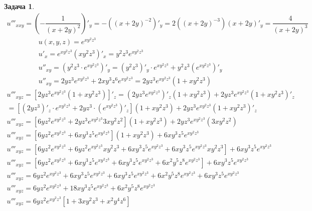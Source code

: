 \documentclass[a4paper,fleqn,12pt]{article}
\theoremstyle{definition}
\newtheorem{task}{Задача}[subsection]
\begin{document}
\begin{task}
\begin{gather*}
u'''_{xxy} = \left( -\dfrac{1}{(x + 2y)^2} \right)'_y = -((x+2y)^{-2})'_y = 2((x+2y)^{-3})(x+2y)'_y = \dfrac{4}{(x+2y)^3}
\end{gather*}
\begin{gather*}
u(x,y,z) = e^{xy^2z^3}\\
u'_x =  e^{xy^2z^3}(xy^2z^3)'_x = y^2z^3e^{xy^2z^3}\\
u''_{xy} = (y^2z^3 \cdot e^{xy^2z^3})'_y = (y^2z^3)'_y \cdot e^{xy^2z^3} + y^2z^3 (e^{xy^2z^3})'_y\\
u''_{xy} = 2yz^3e^{xy^2z^3} + 2xy^3z^6e^{xy^2z^3} =  2yz^3e^{xy^2z^3} (1 + xy^2z^3)
\end{gather*}
\begin{gather*}
u'''_{xyz} = \left[ 2yz^3e^{xy^2z^3} (1 + xy^2z^3) \right]'_z = (2yz^3e^{xy^2z^3})'_z (1 + xy^2z^3) + 2yz^3e^{xy^2z^3}(1 + xy^2z^3)'_z\\
=  \left[(2yz^3)'_z\cdot e^{xy^2z^3}+ 2yz^3 \cdot (e^{xy^2z^3})'_z\right] (1 + xy^2z^3) + 2yz^3e^{xy^2z^3}(1 + xy^2z^3)'_z \\
u'''_{xyz} = \left[6yz^2e^{xy^2z^3} +  2yz^3e^{xy^2z^3}3xy^2z^2 \right] (1 + xy^2z^3) + 2yz^3e^{xy^2z^3} (3xy^2z^2) \\
u'''_{xyz} =  \left[6yz^2e^{xy^2z^3} +  6xy^3z^5e^{xy^2z^3} \right] (1 + xy^2z^3) + 6xy^3z^5e^{xy^2z^3} \\
u'''_{xyz} = \left[6yz^2e^{xy^2z^3} + 6yz^2e^{xy^2z^3} xy^2z^3 + 6xy^3z^5e^{xy^2z^3} + 6xy^3z^5e^{xy^2z^3} xy^2z^3\right] + 6xy^3z^5e^{xy^2z^3}\\
u'''_{xyz} = \left[6yz^2e^{xy^2z^3} + 6xy^3z^5e^{xy^2z^3} + 6xy^3z^5e^{xy^2z^3} + 6x^2y^5z^8e^{xy^2z^3}\right] + 6xy^3z^5e^{xy^2z^3}\\
u'''_{xyz} = 6yz^2e^{xy^2z^3} + 6xy^3z^5e^{xy^2z^3} + 6xy^3z^5e^{xy^2z^3} + 6x^2y^5z^8e^{xy^2z^3}+ 6xy^3z^5e^{xy^2z^3}\\
u'''_{xyz} = 6yz^2e^{xy^2z^3} + 18xy^3z^5e^{xy^2z^3} + 6x^2y^5z^8e^{xy^2z^3}\\
u'''_{xyz} = 6yz^2e^{xy^2z^3} \left[1 + 3xy^2z^3 + x^2y^4z^6 \right]
\end{gather*}
\end{task}
\end{document}
